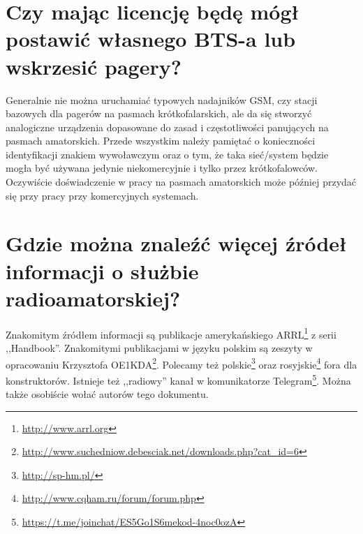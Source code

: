 \documentclass[a4paper,12pt]{article}
\begin{document}
\section{Czy mając licencję będę mógł postawić własnego BTS-a lub wskrzesić pagery?}
Generalnie nie można uruchamiać typowych nadajników GSM, czy stacji bazowych dla pagerów na pasmach krótkofalarskich, ale da się stworzyć analogiczne urządzenia dopasowane do zasad i częstotliwości panujących na pasmach amatorskich. Przede wszystkim należy pamiętać o konieczności identyfikacji znakiem wywoławczym oraz o tym, że taka sieć/system będzie mogła być używana jedynie niekomercyjnie i tylko przez krótkofalowców. Oczywiście doświadczenie w pracy na pasmach amatorskich może później przydać się przy pracy przy komercyjnych systemach.

\section{Gdzie można znaleźć więcej źródeł informacji o służbie radioamatorskiej?}
Znakomitym źródłem informacji są publikacje amerykańskiego ARRL\footnote{\url{http://www.arrl.org}} z serii ,,Handbook''. Znakomitymi publikacjami w języku polskim są zeszyty w opracowaniu Krzysztofa OE1KDA\footnote{\url{http://www.suchedniow.debesciak.net/downloads.php?cat_id=6}}. Polecamy też polskie\footnote{\url{http://sp-hm.pl/}} oraz rosyjskie\footnote{\url{http://www.cqham.ru/forum/forum.php}} fora dla konstruktorów. Istnieje też ,,radiowy'' kanał w komunikatorze Telegram\footnote{\url{https://t.me/joinchat/ES5Go1S6mekod-4noc0ozA}}. Można także osobiście wołać autorów tego dokumentu.
\end{document}
